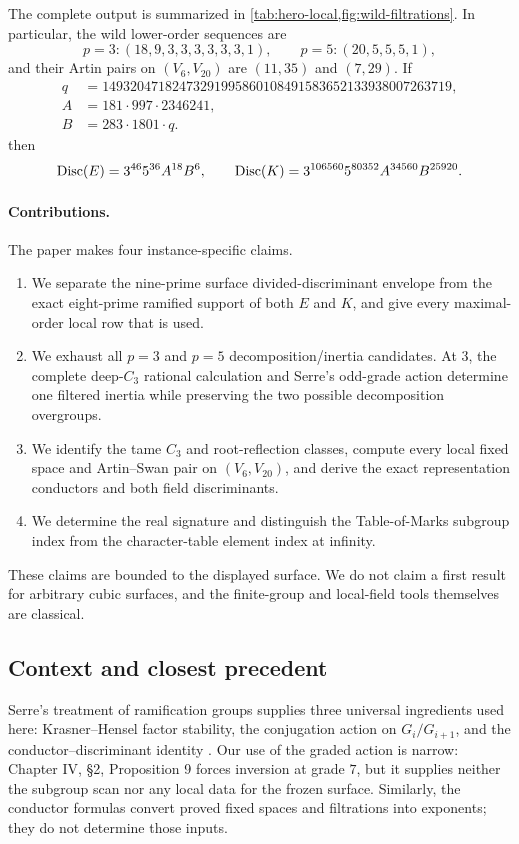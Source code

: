 The complete output is summarized in
\cref{tab:hero-local,fig:wild-filtrations}.  In particular, the wild
lower-order sequences are
\[
 p=3:(18,9,3,3,3,3,3,3,1),\qquad
 p=5:(20,5,5,5,1),
\]
and their Artin pairs on $(V_6,V_{20})$ are $(11,35)$ and $(7,29)$.  If
\[
\begin{aligned}
 q&=14932047182473291995860108491583652133938007263719,\\
 A&=181\cdot997\cdot2346241,\\
 B&=283\cdot1801\cdot q.
\end{aligned}
\]
then
\[
 \operatorname{Disc}(E)=3^{46}5^{36}A^{18}B^6,\qquad
 \operatorname{Disc}(K)=3^{106560}5^{80352}A^{34560}B^{25920}.
\]

\paragraph{Contributions.}
The paper makes four instance-specific claims.
\begin{enumerate}[leftmargin=2.1em]
\item We separate the nine-prime surface divided-discriminant envelope from
the exact eight-prime ramified support of both $E$ and $K$, and give every
maximal-order local row that is used.
\item We exhaust all $p=3$ and $p=5$ decomposition/inertia candidates.  At
$3$, the complete deep-$C_3$ rational calculation and Serre's odd-grade
action determine one filtered inertia while preserving the two possible
decomposition overgroups.
\item We identify the tame $C_3$ and root-reflection classes, compute every
local fixed space and Artin--Swan pair on $(V_6,V_{20})$, and derive the exact
representation conductors and both field discriminants.
\item We determine the real signature and distinguish the Table-of-Marks
subgroup index from the character-table element index at infinity.
\end{enumerate}

These claims are bounded to the displayed surface.  We do not claim a first
result for arbitrary cubic surfaces, and the finite-group and local-field
tools themselves are classical.

\subsection{Context and closest precedent}

Serre's treatment of ramification groups supplies three universal
ingredients used here: Krasner--Hensel factor stability, the conjugation
action on $G_i/G_{i+1}$, and the conductor--discriminant identity
\citep{serre1979local}.  Our use of the graded action is narrow: Chapter IV,
\S2, Proposition 9 forces inversion at grade $7$, but it supplies neither
the subgroup scan nor any local data for the frozen surface.  Similarly, the
conductor formulas convert proved fixed spaces and filtrations into
exponents; they do not determine those inputs.

